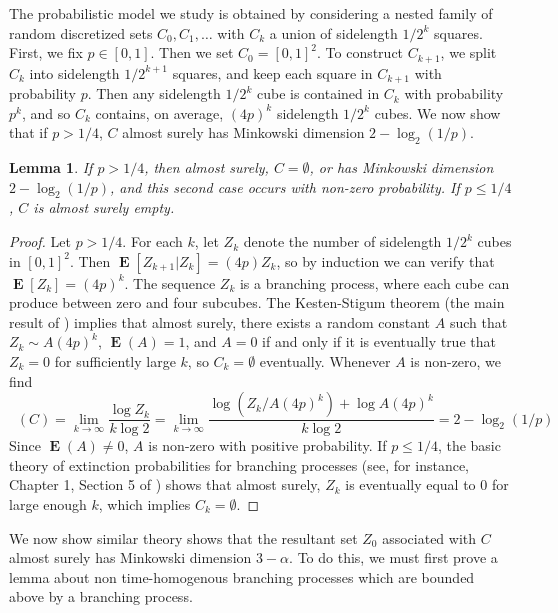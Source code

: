 \documentclass[dvipsnames,letterpaper,12pt]{article}
\theoremstyle{plain}
\newtheorem{lemma}{Lemma}
\DeclareMathOperator{\minkdim}{\dim_{\mathbf{M}}}
\DeclareMathOperator{\Expect}{\mathbf{E}}
\begin{document}
The probabilistic model we study is obtained by considering a nested family of random discretized sets $C_0,C_1, \dots$ with $C_k$ a union of sidelength $1/2^k$ squares. First, we fix $p \in [0,1]$. Then we set $C_0 = [0,1]^2$. To construct $C_{k+1}$, we split $C_k$ into sidelength $1/2^{k+1}$ squares, and keep each square in $C_{k+1}$ with probability $p$. Then any sidelength $1/2^k$ cube is contained in $C_k$ with probability $p^k$, and so $C_k$ contains, on average, $(4p)^k$ sidelength $1/2^k$ cubes. We now show that if $p > 1/4$, $C$ almost surely has Minkowski dimension $2 - \log_2(1/p)$.

\begin{lemma} \label{randomdimension}
	If $p > 1/4$, then almost surely, $C = \emptyset$, or has Minkowski dimension $2 - \log_2(1/p)$, and this second case occurs with non-zero probability. If $p \leq 1/4$, $C$ is almost surely empty.
\end{lemma}
\begin{proof}
	Let $p > 1/4$. For each $k$, let $Z_k$ denote the number of sidelength $1/2^k$ cubes in $[0,1]^2$. Then $\Expect[Z_{k+1}|Z_k] = (4p) Z_k$, so by induction we can verify that $\Expect[Z_k] = (4p)^k$. The sequence $Z_k$ is a branching process, where each cube can produce between zero and four subcubes. The Kesten-Stigum theorem (the main result of \cite{KestenStigum}) implies that almost surely, there exists a random constant $A$ such that $Z_k \sim A (4p)^k$, $\Expect(A) = 1$, and $A = 0$ if and only if it is eventually true that $Z_k = 0$ for sufficiently large $k$, so $C_k = \emptyset$ eventually. Whenever $A$ is non-zero, we find
	\[ \minkdim(C) = \lim_{k \to \infty} \frac{\log Z_k}{k \log 2} = \lim_{k \to \infty} \frac{\log(Z_k/A (4p)^k) + \log A (4p)^k}{k \log 2} = 2 - \log_2(1/p) \]
	Since $\Expect(A) \neq 0$, $A$ is non-zero with positive probability. If $p \leq 1/4$, the basic theory of extinction probabilities for branching processes (see, for instance, Chapter 1, Section 5 of \cite{AthreyaTextbook}) shows that almost surely, $Z_k$ is eventually equal to $0$ for large enough $k$, which implies $C_k = \emptyset$.
\end{proof}

We now show similar theory shows that the resultant set $Z_0$ associated with $C$ almost surely has Minkowski dimension $3 - \alpha$. To do this, we must first prove a lemma about non time-homogenous branching processes which are bounded above by a branching process.
\end{document}
